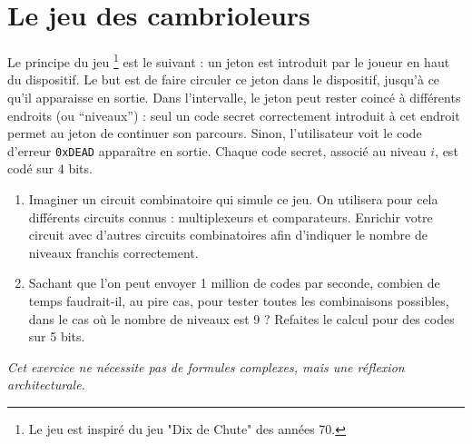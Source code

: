 \documentclass[a4paper,11pt]{article}
\newif\ifsolutions
\begin{document}
\ifsolutions
\begin{solbox}
\begin{enumerate}
    \item $x \oplus y = x\overline{y} + \overline{x}y$
    \item $x \oplus y = \text{SI } (x==y) \text{ ALORS } 0 \text{ SINON } 1$ (C'est l'inverse de l'égalité, c'est un détecteur de différence).
    \item $x \oplus y = \text{SI } (y==1) \text{ ALORS } \overline{x} \text{ SINON } x$. (Si $y=0$, $x \oplus 0 = x$ ; si $y=1$, $x \oplus 1 = \overline{x}$).
\end{enumerate}
\end{solbox}
\fi

\section{Le jeu des cambrioleurs}
Le principe du jeu \footnote{Le jeu est inspiré du jeu "Dix de Chute" des années 70.} est le suivant : un jeton est introduit par le joueur en haut du dispositif. Le but est de faire circuler ce jeton dans le dispositif, jusqu'à ce qu'il apparaisse en sortie. Dans l'intervalle, le jeton peut rester coincé à différents endroits (ou ``niveaux'') : seul un code secret correctement introduit à cet endroit permet au jeton de continuer son parcours. Sinon, l'utilisateur voit le code d'erreur \texttt{0xDEAD} apparaître en sortie. Chaque code secret, associé au niveau $i$, est codé sur 4 bits.

\begin{enumerate}
    \item Imaginer un circuit combinatoire qui simule ce jeu. On utilisera pour cela différents circuits connus : multiplexeurs et comparateurs. Enrichir votre circuit avec d'autres circuits combinatoires afin d'indiquer le nombre de niveaux franchis correctement.
    \item Sachant que l'on peut envoyer 1 million de codes par seconde, combien de temps faudrait-il, au pire cas, pour tester toutes les combinaisons possibles, dans le cas où le nombre de niveaux est 9 ? Refaites le calcul pour des codes sur 5 bits.
\end{enumerate}
\textit{Cet exercice ne nécessite pas de formules complexes, mais une réflexion architecturale.}
\end{document}
